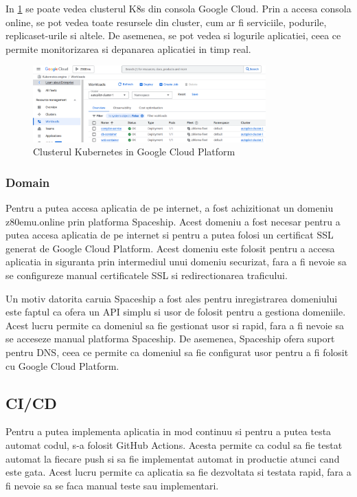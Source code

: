 \documentclass[titlepage,12pt]{article}
\DeclareRobustCommand{\code}[1]{{\ttfamily\small #1}}
\begin{document}
In \cref{fig:googlecluster} se poate vedea clusterul \ac {K8s} din consola Google Cloud. Prin a accesa consola online, se pot vedea toate resursele din cluster, cum ar fi serviciile, podurile, replicaset-urile si altele. De asemenea, se pot vedea si logurile aplicatiei, ceea ce permite monitorizarea si depanarea aplicatiei in timp real.
\begin{figure}[h]
\centering
\includegraphics[width=0.8\textwidth]{images/googlecluster.png}
\caption{Clusterul Kubernetes in Google Cloud Platform}
\label{fig:googlecluster}
\end{figure}

\subsubsection{Domain}
Pentru a putea accesa aplicatia de pe internet, a fost achizitionat un domeniu \code{z80emu.online} prin platforma Spaceship. Acest domeniu a fost necesar pentru a putea accesa aplicatia de pe internet si pentru a putea folosi un certificat \code{SSL} generat de Google Cloud Platform. Acest domeniu este folosit pentru a accesa aplicatia in siguranta prin intermediul unui domeniu securizat, fara a fi nevoie sa se configureze manual certificatele \code{SSL} si redirectionarea traficului.

Un motiv datorita caruia Spaceship a fost ales pentru inregistrarea domeniului este faptul ca ofera un API simplu si usor de folosit pentru a gestiona domeniile. Acest lucru permite ca domeniul sa fie gestionat usor si rapid, fara a fi nevoie sa se acceseze manual platforma Spaceship. De asemenea, Spaceship ofera suport pentru \ac {DNS}, ceea ce permite ca domeniul sa fie configurat usor pentru a fi folosit cu Google Cloud Platform.

\subsection{CI/CD}

Pentru a putea implementa aplicatia in mod continuu si pentru a putea testa automat codul, s-a folosit GitHub Actions. Acesta permite ca codul sa fie testat automat la fiecare push si sa fie implementat automat in productie atunci cand este gata. Acest lucru permite ca aplicatia sa fie dezvoltata si testata rapid, fara a fi nevoie sa se faca manual teste sau implementari.
\end{document}
